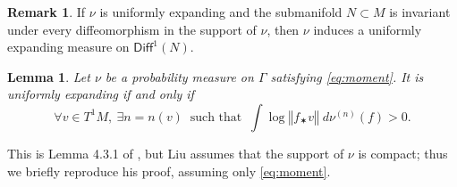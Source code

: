 \documentclass[JEP,XML,SOM,Unicode,published]{cedram}
\newcommand{\norm}[1]{{\left\Vert#1\right\Vert}}
\newcommand\Diff{{\mathsf{Diff}}}
\theoremstyle{plain}
\newtheorem{lem}[thm]{Lemma}
\theoremstyle{definition}
\newtheorem{rem}[thm]{Remark}
\begin{document}
\begin{rem} \label{rem:restriction_UE}
If $\nu$ is uniformly expanding and the submanifold $N\subset M$ is invariant under every diffeomorphism in the support of $\nu$,
then $\nu$ induces a uniformly expanding measure on $\Diff^1(N)$.
\end{rem}

\begin{lem}\label{lem:weak_UE}
Let $\nu$ be a probability measure on $\Gamma$ satisfying \eqref{eq:moment}.
It is uniformly expanding if and only if
\begin{equation}\label{eq:weak_UE}
\forall v\in T^1M, \ \exists n = n(v) \ \text{ such that } \
\int \log \norm{f_\varstar v } \; d\nu^{(n)}(f) >0.
\end{equation}
\end{lem}

This is Lemma 4.3.1 of \cite{liu_thesis}, but Liu assumes that the support of $\nu$ is compact; thus
we briefly reproduce his proof, assuming only \eqref{eq:moment}.
\end{document}
